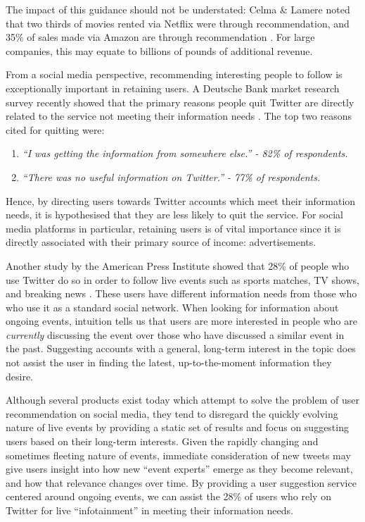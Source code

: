 \documentclass{l4proj}
\begin{document}
The impact of this guidance should not be understated: Celma \& Lamere noted that two thirds of movies rented via Netflix were through recommendation, and 35\% of sales made via Amazon are through recommendation \cite{celmaLamere}. For large companies, this may equate to billions of pounds of additional revenue.

From a social media perspective, recommending interesting people to follow is exceptionally important in retaining users. A Deutsche Bank market research survey recently showed that the primary reasons people quit Twitter are directly related to the service not meeting their information needs \cite{leavingTwitter}. The top two reasons cited for quitting were:

\begin{enumerate}
    \item \textit{``I was getting the information from somewhere else.'' - 82\% of respondents. }
    \item \textit{``There was no useful information on Twitter.'' - 77\% of respondents.}
\end{enumerate}

Hence, by directing users towards Twitter accounts which meet their information needs, it is hypothesised that they are less likely to quit the service. For social media platforms in particular, retaining users is of vital importance since it is directly associated with their primary source of income: advertisements.

Another study by the American Press Institute showed that 28\% of people who use Twitter do so in order to follow live events such as sports matches, TV shows, and breaking news \cite{twitterNews}. These users have different information needs from those who who use it as a standard social network. When looking for information about ongoing events, intuition tells us that users are more interested in people who are \textit{currently} discussing the event over those who have discussed a similar event in the past. Suggesting accounts with a general, long-term interest in the topic does not assist the user in finding the latest, up-to-the-moment information they desire.

Although several products exist today which attempt to solve the problem of user recommendation on social media, they tend to disregard the quickly evolving nature of live events by providing a static set of results and focus on suggesting users based on their long-term interests. Given the rapidly changing and sometimes fleeting nature of events, immediate consideration of new tweets may give users insight into how new ``event experts'' emerge as they become relevant, and how that relevance changes over time. By providing a user suggestion service centered around ongoing events, we can assist the 28\% of users who rely on Twitter for live ``infotainment'' in meeting their information needs.
\end{document}

